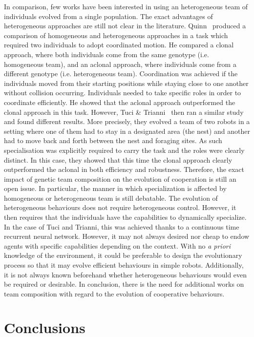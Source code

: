     In comparison, few works have been interested in using an heterogeneous team of individuals evolved from a single population. The exact advantages of heterogeneous approaches are still not clear in the literature. Quinn~\parencite{Quinn2001} produced a comparison of homogeneous and heterogeneous approaches in a task which required two individuals to adopt coordinated motion. He compared a clonal approach, where both individuals come from the same genotype (i.e. homogeneous team), and an aclonal approach, where individuals come from a different genotype (i.e. heterogeneous team). Coordination was achieved if the individuals moved from their starting positions while staying close to one another without collision occurring. Individuals needed to take specific roles in order to coordinate efficiently. He showed that the aclonal approach outperformed the clonal approach in this task. However, Tuci \& Trianni~\parencite{Tuci2014} then ran a similar study and found different results. More precisely, they evolved a team of two robots in a setting where one of them had to stay in a designated area (the nest) and another had to move back and forth between the nest and foraging sites. As such specialisation was explicitly required to carry the task and the roles were clearly distinct. In this case, they showed that this time the clonal approach clearly outperformed the aclonal in both efficiency and robustness.  Therefore, the exact impact of genetic team composition on the evolution of cooperation is still an open issue. In particular, the manner in which specialization is affected by homogeneous or heterogeneous team is still debatable. The evolution of heterogeneous behaviours does not require heterogeneous control. However, it then requires that the individuals have the capabilities to dynamically specialize. In the case of Tuci and Trianni, this was achieved thanks to a continuous time recurrent neural network. However, it may not always desired nor cheap to endow agents with specific capabilities depending on the context. With no \emph{a priori} knowledge of the environment, it could be preferable to design the evolutionary process so that it may evolve efficient behaviours in simple robots. Additionally, it is not always known beforehand whether heterogeneous behaviours would even be required or desirable. In conclusion, there is the need for additional works on team composition with regard to the evolution of cooperative behaviours.


\section{Conclusions}

